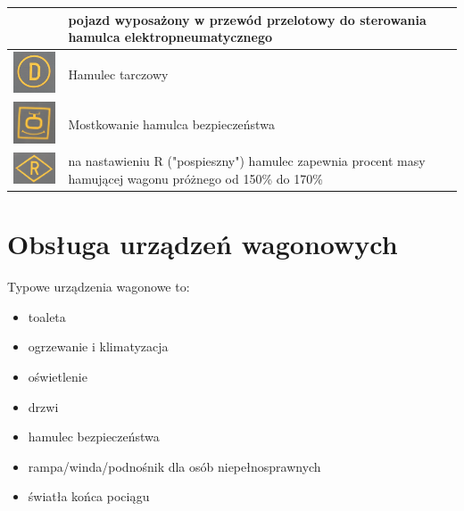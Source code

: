 \begin{table}
\begin{tabular}{|c|m{12cm}|}
	& pojazd wyposażony w przewód przelotowy do sterowania hamulca elektropneumatycznego\\
	\hline
	\includegraphics[width=2.5cm]{skryptkierownik-img/skryptkierownik-img030.jpg} & Hamulec tarczowy\\
	\hline
	\includegraphics[width=2.5cm]{skryptkierownik-img/skryptkierownik-img031.jpg} & Mostkowanie hamulca bezpieczeństwa\\
	\hline
	\includegraphics[width=2.5cm]{skryptkierownik-img/skryptkierownik-img032.jpg} & na nastawieniu R ("pospieszny") hamulec zapewnia procent masy hamującej wagonu próżnego od 150\% do 170\%\\
	\hline
\end{tabular}
\end{table} 

\chapter{Obsługa urządzeń wagonowych}

Typowe urządzenia wagonowe to:

\begin{itemize}
	\item toaleta
	\item ogrzewanie i klimatyzacja
	\item oświetlenie
	\item drzwi
	\item hamulec bezpieczeństwa
	\item rampa/winda/podnośnik dla osób niepełnosprawnych
	\item światła końca pociągu
\end{itemize}

